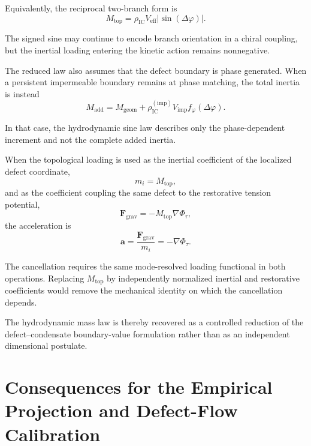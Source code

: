 Equivalently, the reciprocal two-branch form is
\begin{equation}
    M_{\mathrm{top}} = \rho_{\mathrm{IC}} V_{\mathrm{eff}} |\sin(\Delta\varphi)|.
\end{equation}

The signed sine may continue to encode branch orientation in a chiral coupling, but the inertial loading entering the kinetic action remains nonnegative.

The reduced law also assumes that the defect boundary is phase generated. When a persistent impermeable boundary remains at phase matching, the total inertia is instead
\begin{equation}
    M_{\mathrm{add}} = M_{\mathrm{geom}} + \rho_{\mathrm{IC}}^{(\mathrm{imp})} V_{\mathrm{imp}} f_{\varphi}(\Delta\varphi).
\end{equation}

In that case, the hydrodynamic sine law describes only the phase-dependent increment and not the complete added inertia.

When the topological loading is used as the inertial coefficient of the localized defect coordinate,
\begin{equation}
    m_i = M_{\mathrm{top}},
\end{equation}
and as the coefficient coupling the same defect to the restorative tension potential,
\begin{equation}
    \mathbf{F}_{\mathrm{grav}} = -M_{\mathrm{top}} \nabla\Phi_{\tau},
\end{equation}
the acceleration is
\begin{equation}
    \mathbf{a} = \frac{\mathbf{F}_{\mathrm{grav}}}{m_i} = -\nabla\Phi_{\tau}.
\end{equation}

The cancellation requires the same mode-resolved loading functional in both operations. Replacing $M_{\mathrm{top}}$ by independently normalized inertial and restorative coefficients would remove the mechanical identity on which the cancellation depends.

The hydrodynamic mass law is thereby recovered as a controlled reduction of the defect–condensate boundary-value formulation rather than as an independent dimensional postulate. 

\section{Consequences for the Empirical Projection and Defect-Flow Calibration}

